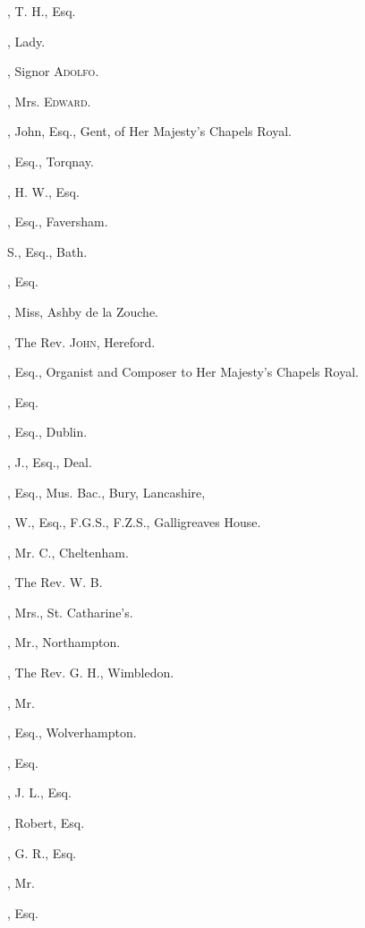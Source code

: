 \begin{multicols}{2}
, T. H., Esq.

, Lady.

, Signor \textsc{Adolfo}.

, Mrs. \textsc{Edward}.

, John, Esq., Gent, of Her Majesty’s
Chapels Royal.

, Esq., Torqnay.
\bigskip

, H. W., Esq.

, Esq., Faversham.

 S., Esq., Bath.

, Esq.

, Miss, Ashby de la Zouche.

, The Rev. \textsc{John}, Hereford.
\columnbreak

, Esq., Organist and Composer
to Her Majesty’s Chapels Royal.

, Esq.
\bigskip

, Esq., Dublin.

, J., Esq., Deal.

, Esq., Mus. Bac., Bury,
Lancashire,

, W., Esq., F.G.S., F.Z.S., Galligreaves
House.

, Mr. C., Cheltenham.

, The Rev. W. B.

, Mrs., St. Catharine’s.

, Mr., Northampton.

, The Rev. G. H., Wimbledon.

, Mr.

, Esq., Wolverhampton.

, Esq.

, J. L., Esq.

, Robert, Esq.

, G. R., Esq.

, Mr.

, Esq.


\end{multicols}
